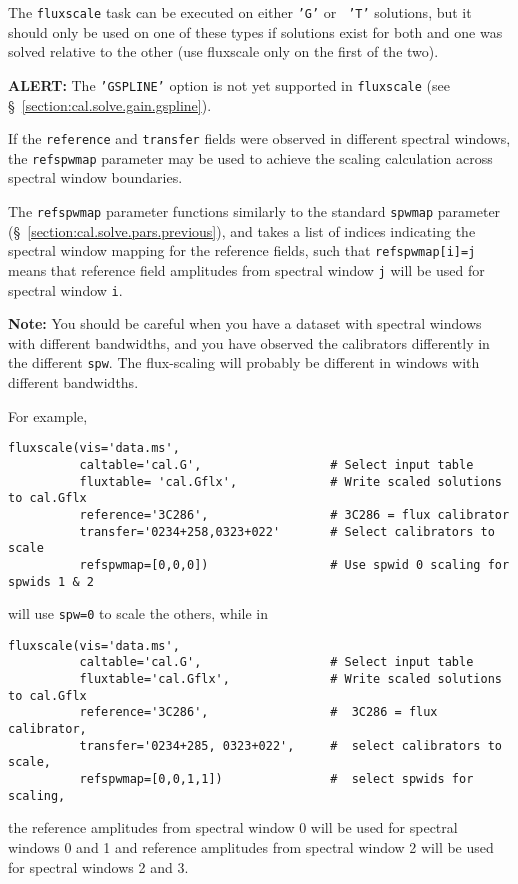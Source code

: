The {\tt fluxscale} task can be executed on either {\tt 'G'} or {\tt
'T'} solutions, but it should only be used on one of these types if
solutions exist for both and one was solved relative to the other (use
fluxscale only on the first of the two).  

{\bf ALERT:} The {\tt 'GSPLINE'} option is not yet supported in
{\tt fluxscale} (see \S~\ref{section:cal.solve.gain.gspline}).

If the {\tt reference} and {\tt transfer} fields were observed in different
spectral windows, the {\tt refspwmap} parameter may be used
to achieve the scaling calculation across spectral window boundaries.

The {\tt refspwmap} parameter functions similarly to the standard
{\tt spwmap} parameter (\S~\ref{section:cal.solve.pars.previous}),
and takes a list of indices
indicating the spectral window mapping for the reference fields,
such that {\tt refspwmap[i]=j} means that reference field amplitudes
from spectral window {\tt j} will be used for spectral window {\tt i}.

{\bf Note:} You should be careful when you have a dataset with
spectral windows with different bandwidths, and you
have observed the calibrators differently in the different {\tt spw}.
The flux-scaling will probably be different in windows with different
bandwidths.

For example,
\small
\begin{verbatim}
fluxscale(vis='data.ms',
          caltable='cal.G',                  # Select input table
          fluxtable= 'cal.Gflx',             # Write scaled solutions to cal.Gflx
          reference='3C286',                 # 3C286 = flux calibrator
          transfer='0234+258,0323+022'       # Select calibrators to scale
          refspwmap=[0,0,0])                 # Use spwid 0 scaling for spwids 1 & 2
\end{verbatim}
\normalsize
will use {\tt spw=0} to scale the others, while in
\small
\begin{verbatim}
fluxscale(vis='data.ms',
          caltable='cal.G',                  # Select input table
          fluxtable='cal.Gflx',              # Write scaled solutions to cal.Gflx
          reference='3C286',                 #  3C286 = flux calibrator,
          transfer='0234+285, 0323+022',     #  select calibrators to scale,
          refspwmap=[0,0,1,1])               #  select spwids for scaling,
\end{verbatim}
\normalsize
the reference amplitudes from spectral window 0 will be
used for spectral windows 0 and 1 and reference amplitudes from
spectral window 2 will be used for spectral windows 2 and 3.

